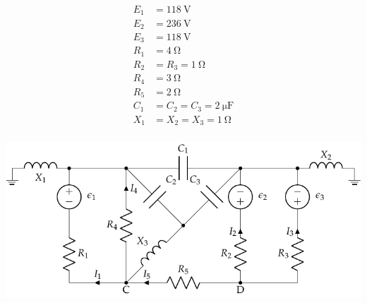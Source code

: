 \documentclass[12pt]{article}
\begin{document}
  \begin{minipage}[c]{0.3\linewidth}
  \begin{align*}
    E_{1}&=\SI{118}{\volt}\\
    E_{2}&=\SI{236}{\volt}\\
    E_{3}&=\SI{118}{\volt}\\
    R_{1}&= \SI{4}{\ohm}\\
    R_{2}&=R_{3}=\SI{1}{\ohm}\\
    R_{4}&= \SI{3}{\ohm}\\
    R_{5}&= \SI{2}{\ohm}\\
    C_{1}&=C_{2}=C_{3}=\SI{2}{\micro\farad}\\
    X_1 &= X_2 = X_3 = \SI{1}{\ohm}\\
  \end{align*}
  \end{minipage}
  \begin{minipage}[c]{0.7\linewidth}
    \includegraphics{figs/mallas_condensadores.pdf}
  \end{minipage}
\end{document}

